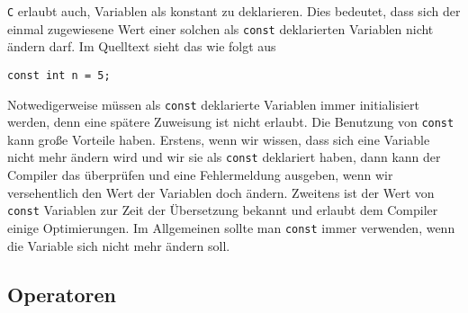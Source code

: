 \texttt{C} erlaubt auch, Variablen als konstant zu deklarieren. 
Dies bedeutet, dass sich der einmal zugewiesene Wert einer solchen als \verb|const| deklarierten Variablen nicht ändern darf.
Im Quelltext sieht das wie folgt aus
\begin{lstlisting}
const int n = 5;
\end{lstlisting}
Notwedigerweise müssen als \verb|const| deklarierte Variablen immer initialisiert werden, denn eine spätere Zuweisung ist nicht erlaubt.
Die Benutzung von \verb|const| kann große Vorteile haben.
Erstens, wenn wir wissen, dass sich eine Variable nicht mehr ändern wird und wir sie als  \verb|const| deklariert haben, dann kann der Compiler das überprüfen und eine Fehlermeldung ausgeben, wenn wir versehentlich den Wert der Variablen doch ändern.
Zweitens ist der Wert von \verb|const| Variablen zur Zeit der Übersetzung bekannt und erlaubt dem Compiler einige Optimierungen.
Im Allgemeinen sollte man \verb|const| immer verwenden, wenn die Variable sich nicht mehr ändern soll.

\subsection{Operatoren}

